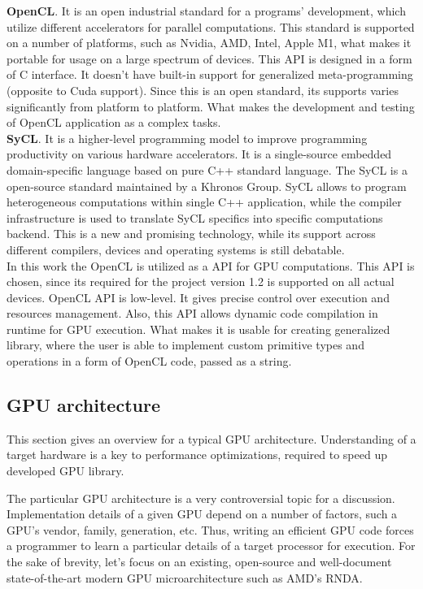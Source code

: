 \textbf{OpenCL}. It is an open industrial standard for a programs' development, which utilize different accelerators for parallel computations. This standard is supported on a number of platforms, such as Nvidia, AMD, Intel, Apple M1, what makes it portable for usage on a large spectrum of devices. This API is designed in a form of C interface. It doesn't have built-in support for generalized meta-programming (opposite to Cuda support). Since this is an open standard, its supports varies significantly from platform to platform. What makes the development and testing of OpenCL application as a complex tasks.\\

\textbf{SyCL}. It is a higher-level programming model to improve programming productivity on various hardware accelerators. It is a single-source embedded domain-specific language based on pure C++ standard language. The SyCL is a open-source standard maintained by a Khronos Group. SyCL allows to program heterogeneous computations within single C++ application, while the compiler infrastructure is used to translate SyCL specifics into specific computations backend. This is a new and promising technology, while its support across different compilers, devices and operating systems is still debatable.\\

In this work the OpenCL is utilized as a API for GPU computations. This API is chosen, since its required for the project version 1.2 is supported on all actual devices. OpenCL API is low-level. It gives precise control over execution and resources management. Also, this API allows dynamic code compilation in runtime for GPU execution. What makes it is usable for creating generalized library, where the user is able to implement custom primitive types and operations in a form of OpenCL code, passed as a string.

\subsection{GPU architecture}

This section gives an overview for a typical GPU architecture. Understanding of a target hardware is a key to performance optimizations, required to speed up developed GPU library.

The particular GPU architecture is a very controversial topic for a discussion. Implementation details of a given GPU depend on a number of factors, such a GPU's vendor, family, generation, etc. Thus, writing an efficient GPU code forces a programmer to learn a particular details of a target processor for execution. For the sake of brevity, let's focus on an existing, open-source and well-document state-of-the-art modern GPU microarchitecture such as AMD's RNDA.

